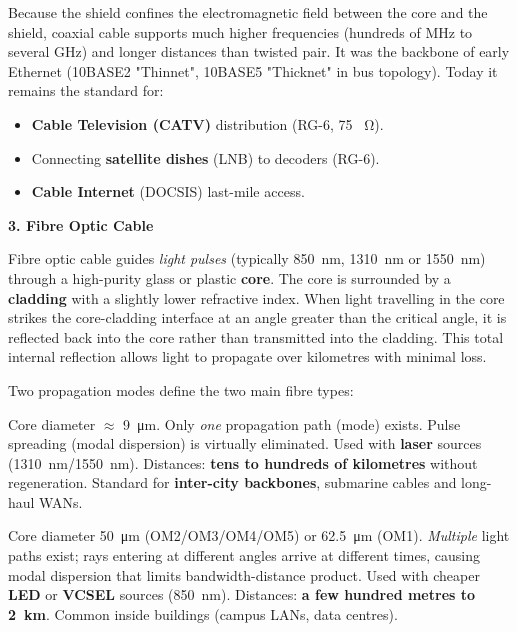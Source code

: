 \documentclass[11pt]{article}
\newcommand{\cle}[1]{{\popxbold\color{popdark}#1}}
\begin{document}
Because the shield confines the electromagnetic field between the core and the shield, coaxial cable supports much higher frequencies (hundreds of MHz to several GHz) and longer distances than twisted pair. It was the backbone of early Ethernet (10BASE2 "Thinnet", 10BASE5 "Thicknet" in bus topology). Today it remains the standard for:
\begin{itemize}
\item \textbf{Cable Television (CATV)} distribution (RG-6, 75 \SI{}{\ohm}).
\item Connecting \textbf{satellite dishes} (LNB) to decoders (RG-6).
\item \textbf{Cable Internet} (DOCSIS) last-mile access.
\end{itemize}

\textbf{3. Fibre Optic Cable}\par
Fibre optic cable guides \emph{light pulses} (typically \SI{850}{nm}, \SI{1310}{nm} or \SI{1550}{nm}) through a high-purity glass or plastic \textbf{core}. The core is surrounded by a \textbf{cladding} with a slightly lower refractive index. When light travelling in the core strikes the core-cladding interface at an angle greater than the \cle{critical angle}, it is reflected back into the core rather than transmitted into the cladding. This \cle{total internal reflection} allows light to propagate over kilometres with minimal loss.

Two propagation modes define the two main fibre types:

\begin{definition}
Core diameter $\approx$ \SI{9}{\micro\meter}. Only \emph{one} propagation path (mode) exists. Pulse spreading (modal dispersion) is virtually eliminated. Used with \textbf{laser} sources (\SI{1310}{nm}/\SI{1550}{nm}). Distances: \textbf{tens to hundreds of kilometres} without regeneration. Standard for \textbf{inter-city backbones}, submarine cables and long-haul WANs.
\end{definition}

\begin{definition}
Core diameter \SI{50}{\micro\meter} (OM2/OM3/OM4/OM5) or \SI{62.5}{\micro\meter} (OM1). \emph{Multiple} light paths exist; rays entering at different angles arrive at different times, causing \cle{modal dispersion} that limits bandwidth-distance product. Used with cheaper \textbf{LED} or \textbf{VCSEL} sources (\SI{850}{nm}). Distances: \textbf{a few hundred metres to \SI{2}{km}}. Common inside buildings (campus LANs, data centres).
\end{definition}
\end{document}
